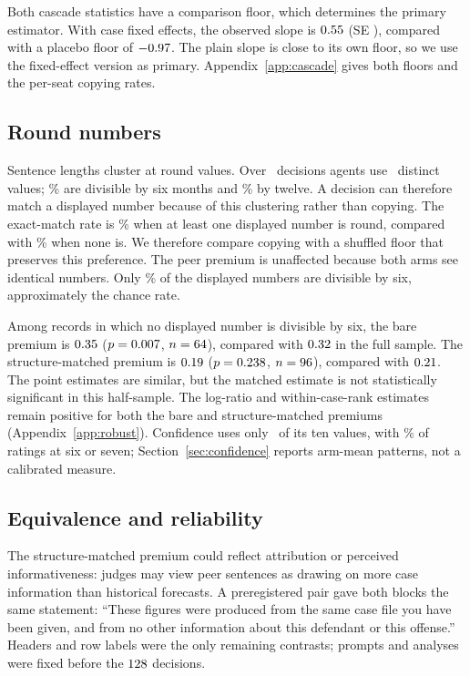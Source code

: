 \documentclass{article}
\begin{document}
Both cascade statistics have a comparison floor, which determines the primary estimator. With case
fixed effects, the observed slope is $0.55$ (SE \cascBetaFEse), compared with a placebo floor
of $-0.97$. The plain slope is close to its own floor, so we use the fixed-effect version as
primary.
Appendix~\ref{app:cascade} gives both floors and the per-seat copying rates.

\subsection{Round numbers}
\label{sec:round}

Sentence lengths cluster at round values. Over \rbSentN\ decisions agents use \rbDistinct\ distinct values;
\rbDivSix\% are divisible by six months and \rbDivTwelve\% by twelve. A decision can therefore
match a displayed number because of this clustering rather than copying. The exact-match
rate is \rbMatchRound\% when at least one displayed number is round, compared with \rbMatchPlain\%
when none is. We therefore compare copying with a shuffled floor that preserves this preference.
The peer premium is unaffected because both arms see identical numbers. Only \rbAncSix\% of the
displayed numbers are divisible by six, approximately the chance rate.

Among records in which no displayed number is divisible by six, the bare premium is $0.35$
($p=0.007$, $n=64$), compared with $0.32$ in the full sample. The structure-matched
premium is $0.19$ ($p=0.238$, $n=96$), compared with $0.21$. The point estimates are
similar, but the matched estimate is not statistically significant in this half-sample. The log-ratio
and within-case-rank estimates remain positive for both the bare and structure-matched premiums
(Appendix~\ref{app:robust}). Confidence uses only \rbConfDistinct\ of its ten values, with
\rbConfTop\% of ratings at six or seven; Section~\ref{sec:confidence} reports arm-mean patterns,
not a calibrated measure.

\subsection{Equivalence and reliability}
\label{sec:equiv}

The structure-matched premium could reflect attribution or perceived informativeness: judges may
view peer sentences as drawing on more case information than historical forecasts. A preregistered
pair gave both blocks the same statement: ``These figures were produced from the same case file you
have been given, and from no other information about this defendant or this offense.'' Headers and
row labels were the only remaining contrasts; prompts and analyses were fixed before the $128$
decisions.
\end{document}
